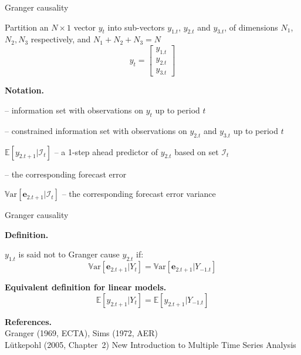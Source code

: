 \documentclass[notes,blackandwhite,mathsans,usenames,dvipsnames]{beamer}
\begin{document}
\begin{frame}{Granger causality}

{\color{mcxs2}Partition an $N\times 1$ vector} $y_t$ {\color{mcxs2}into sub-vectors} $y_{1.t}$, $y_{2.t}$ {\color{mcxs2}and} $y_{3.t}${\color{mcxs2}, of dimensions} $N_1$, $N_2, N_3$ {\color{mcxs2}respectively, and} $N_1 + N_2 + N_3 = N$
$$ y_t = \begin{bmatrix} y_{1.t} \\ y_{2.t} \\ y_{3.t} \end{bmatrix} $$

\small
\textbf{Notation. }
\begin{description}
\item[$Y_t$] {\color{mcxs2}-- information set with observations on} $y_t$ {\color{mcxs2}up to period} $t$
\item[$Y_{-1.t}$] {\color{mcxs2}-- {\color{mcxs1}constrained information set} with observations on }$y_{2.t}$ {\color{mcxs2}and} $y_{3.t}$ {\color{mcxs2}up to period} $t$
\item $\mathbb{E}[y_{2.t+1}|\mathcal{I}_t]$ {\color{mcxs2}-- a 1-step ahead predictor of} $y_{2.t}$ {\color{mcxs2} based on set} $\mathcal{I}_t$
\item[$\mathbf{e}_{2.t+1}$] {\color{mcxs2}-- the corresponding forecast error}
\item $\mathbb{V}\text{ar}[\mathbf{e}_{2.t+1}|\mathcal{I}_t]$ {\color{mcxs2}-- the corresponding forecast error variance}
\end{description}

\end{frame}


\begin{frame}{Granger causality}

\textbf{Definition.}

 $y_{1.t}$ {\color{mcxs2}is said {\color{mcxs1}not to Granger cause}} $y_{2.t}$ {\color{mcxs2}if:}
$$ \mathbb{V}\text{ar}[\mathbf{e}_{2.t+1}|Y_t] = \mathbb{V}\text{ar}[\mathbf{e}_{2.t+1}|Y_{-1.t}] $$

\bigskip\textbf{Equivalent definition for linear models.}
$$ \mathbb{E}\left[y_{2.t+1}|Y_t\right] = \mathbb{E}\left[y_{2.t+1}|Y_{-1.t}\right] $$

\bigskip\textbf{References.} \\ \footnotesize
{\color{mcxs2}Granger (1969, ECTA), Sims (1972, AER)\\ L\"utkepohl (2005, Chapter~2) New Introduction to Multiple Time Series Analysis}
\end{frame}
\end{document}
